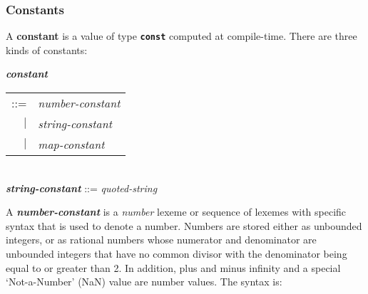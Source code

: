 \documentclass[12pt]{article}
\newcommand{\key}[1]{{\rm \bfseries #1}}
\newcommand{\ttkey}[1]{{\tt \bfseries #1}}
\newcommand{\emkey}[1]{{\em \bfseries #1}}
\newenvironment{indpar}[1][0.3in]%
	{\begin{list}{}%
		     {\setlength{\itemsep}{0in}%
		      \setlength{\topsep}{0in}%
		      \setlength{\parsep}{1ex}%
		      \setlength{\labelwidth}{#1}%
		      \setlength{\leftmargin}{#1}%
		      \addtolength{\leftmargin}{\labelsep}}%
	 \item}%
	{\end{list}}
\begin{document}
\subsubsection{Constants}
\label{CONSTANTS}

A \key{constant} is a value of type \ttkey{const} computed at
compile-time.  There are three kinds of constants:

\begin{indpar}
\emkey{constant}
    \begin{tabular}[t]{rl}
    ::= & {\em number-constant} \\
    $|$ & {\em string-constant} \\
    $|$ & {\em map-constant} \\
    \end{tabular} \\
\emkey{string-constant} ::= {\em quoted-string}
\end{indpar}

A \emkey{number-constant} is a {\em number} lexeme or sequence of
lexemes with specific syntax
that is used to denote a number.  Numbers are stored either
as unbounded integers, or as rational numbers whose numerator
and denominator are unbounded integers that have no common divisor
with the denominator being equal to or greater than 2.  In addition,
plus and minus infinity and a special `Not-a-Number' (NaN) value
are number values.
The syntax is:
\end{document}
